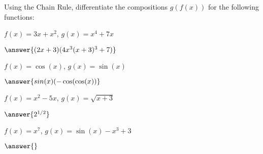 \documentclass{ximera}
\begin{document}
\begin{question}

Using the Chain Rule, differentiate the compositions $g(f(x))$ for the following functions:

$f(x) = 3x+x^2$, $g(x) = x^4+7x$

$\answer{(2x+3)(4x^3(x+3)^3+7)}$

$f(x) = \cos(x)$, $g(x) = \sin(x)$

$\answer{sin(x)(-\cos(\cos(x))}$

$f(x) = x^2-5x$, $g(x) = \sqrt{x+3}$

$\answer{2^{1/2}}$

$f(x) = x^7$, $g(x) = \sin(x)-x^3+3$

$\answer{}$
\end{question}
\end{document}
